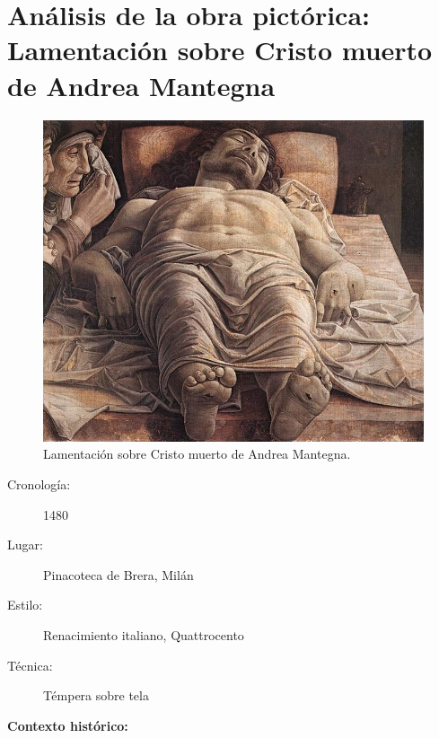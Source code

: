 \section{Análisis de la obra pictórica: Lamentación sobre Cristo muerto de Andrea Mantegna}

\begin{figure}[ht!]
	\includegraphics[width=\textwidth]{mantegna.jpg}
	\caption{Lamentación sobre Cristo muerto de Andrea Mantegna.} %
\end{figure}

\newpage

\begin{description}
\item[Cronología:] 1480
\item[Lugar:] Pinacoteca de Brera, Milán
\item[Estilo:] Renacimiento italiano, Quattrocento
\item[Técnica:] Témpera sobre tela
\end{description}

\textbf{Contexto histórico:}

